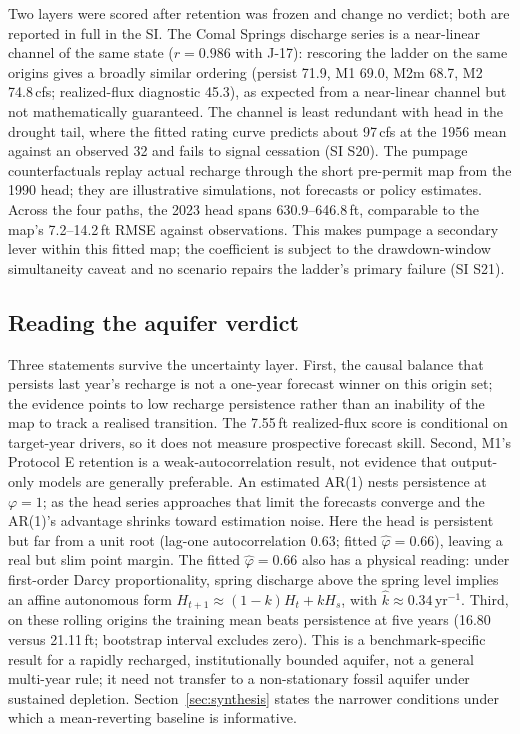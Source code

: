 Two layers were scored after retention was frozen and change no verdict; both are reported in full in the SI. The Comal Springs discharge series is a near-linear channel of the same state ($r=0.986$ with J-17): rescoring the ladder on the same origins gives a broadly similar ordering (persist 71.9, M1 69.0, M2m 68.7, M2 74.8\,cfs; realized-flux diagnostic 45.3), as expected from a near-linear channel but not mathematically guaranteed. The channel is least redundant with head in the drought tail, where the fitted rating curve predicts about 97\,cfs at the 1956 mean against an observed 32 and fails to signal cessation (SI S20). The pumpage counterfactuals replay actual recharge through the short pre-permit map from the 1990 head; they are illustrative simulations, not forecasts or policy estimates. Across the four paths, the 2023 head spans 630.9--646.8\,ft, comparable to the map's 7.2--14.2\,ft RMSE against observations. This makes pumpage a secondary lever within this fitted map; the coefficient is subject to the drawdown-window simultaneity caveat and no scenario repairs the ladder's primary failure (SI S21).

\subsection{Reading the aquifer verdict}\label{sec:edwreading}

Three statements survive the uncertainty layer. First, the causal balance that persists last year's recharge is not a one-year forecast winner on this origin set; the evidence points to low recharge persistence rather than an inability of the map to track a realised transition. The 7.55\,ft realized-flux score is conditional on target-year drivers, so it does not measure prospective forecast skill. Second, M1's Protocol E retention is a weak-autocorrelation result, not evidence that output-only models are generally preferable. An estimated AR(1) nests persistence at $\varphi=1$; as the head series approaches that limit the forecasts converge and the AR(1)'s advantage shrinks toward estimation noise. Here the head is persistent but far from a unit root (lag-one autocorrelation 0.63; fitted $\hat\varphi=0.66$), leaving a real but slim point margin.  The fitted $\hat\varphi=0.66$ also has a physical reading: under first-order Darcy proportionality, spring discharge above the spring level implies an affine autonomous form $H_{t+1}\approx(1-k)H_t+kH_s$, with $\hat k\approx0.34$\,yr$^{-1}$. Third, on these rolling origins the training mean beats persistence at five years (16.80 versus 21.11\,ft; bootstrap interval excludes zero). This is a benchmark-specific result for a rapidly recharged, institutionally bounded aquifer, not a general multi-year rule; it need not transfer to a non-stationary fossil aquifer under sustained depletion. Section~\ref{sec:synthesis} states the narrower conditions under which a mean-reverting baseline is informative.
